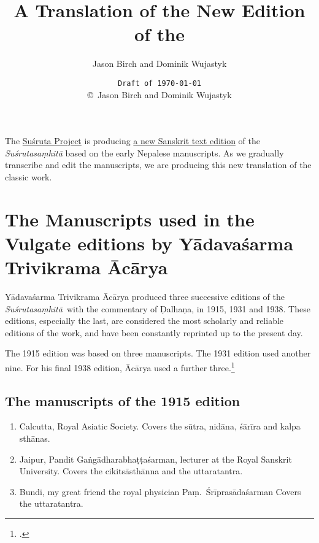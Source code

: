 \documentclass[12pt]{article}
\title{A Translation of the New Edition of the \SS}
\author{Jason Birch and Dominik Wujastyk}
\date{\texttt{Draft of \today}\\ \copyright\ Jason Birch and Dominik Wujastyk}
\renewcommand{\SS}{\emph{Suśrutasaṃhitā}}
\begin{document}
       
    
    \maketitle
    
    
        \noindent The \href{http://sushrutaproject.org}{Suśruta Project} is
producing
\href{https://saktumiva.org/wiki/wujastyk/susrutasamhita/01-su.su/provisional-edition_sutrasthana}{a
 new Sanskrit text edition} of the \emph{Suśrutasaṃhitā} based on the early 
Nepalese manuscripts.  As we gradually transcribe and edit the manuscripts, we are 
producing this new translation of the classic work.
        
        \tableofcontents
        
        \newpage
        \section{The Manuscripts used in the Vulgate editions by 
        Yādavaśarma Trivikrama Ācārya}
    
        Yādavaśarma Trivikrama Ācārya produced three successive editions of the \SS\ 
        with the commentary of Ḍalhaṇa, in 1915, 1931 and 1938.  These editions, 
        especially the last, are considered the most scholarly and reliable editions of the 
        work, and have been constantly reprinted up to the present day.
        
        The 1915 edition was based on three manuscripts.  The 1931 edition used 
        another nine.  For his final 1938 edition, Ācārya used a further 
        three.\footnote{\cite[22]{susr-trikamji3}.}
        
        \subsection{The manuscripts of the 1915 edition}
        
        \begin{enumerate}
            \item[1] Calcutta, Royal Asiatic Society.  Covers the sūtra, nidāna, śārīra and 
            kalpa sthānas.  
            
            \item [2] Jaipur, Pandit Gaṅgādharabhaṭṭaśarman, lecturer at the Royal 
            Sanskrit University.  Covers the cikitsāsthānna and the uttaratantra.
            
            \item [3]  Bundi, my great friend the royal physician Paṃ.\ Śrīprasādaśarman  
            Covers the uttaratantra.
        \end{enumerate}
        
\end{document}
